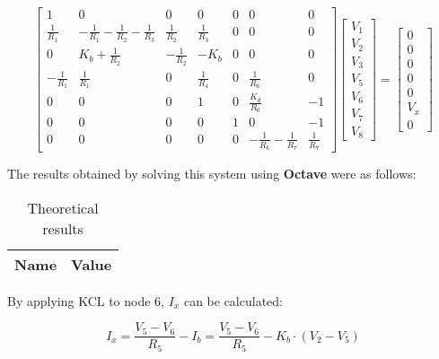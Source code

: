 \begin{equation}
  \begin{bmatrix}
    1 & 0 & 0 & 0 & 0 & 0 & 0 \\
    \frac{1}{R_1} & -\frac{1}{R_1}-\frac{1}{R_2}-\frac{1}{R_3} & \frac{1}{R_2} & \frac{1}{R_3} & 0 & 0 & 0 \\
    0 & K_b + \frac{1}{R_2} & -\frac{1}{R_2} & -K_b & 0 & 0 & 0 \\
    -\frac{1}{R_1} & \frac{1}{R_1} & 0 & \frac{1}{R_4} & 0 &\frac{1}{R_6} & 0 \\
    0 & 0 & 0 & 1 & 0 & \frac{K_d}{R_6} & -1 \\
    0 & 0 & 0 & 0 & 1 & 0 & -1 \\
    0 & 0 & 0 & 0 & 0 & -\frac{1}{R_6}-\frac{1}{R_7} & \frac{1}{R_7}
  \end{bmatrix}
  \begin{bmatrix}
    V_1 \\
    V_2 \\
    V_3 \\
    V_5 \\
    V_6 \\
    V_7 \\
    V_8
  \end{bmatrix}
  =
  \begin{bmatrix}
    0 \\
    0 \\
    0 \\
    0 \\
    0 \\
    V_x \\
    0
  \end{bmatrix}
\end{equation}

The results obtained by solving this system using \textbf{Octave} were as follows:

\begin{table}[H]
  \centering
  \begin{tabular}{|c|c|}
    \hline
        {\bf Name} & {\bf Value} \\
        \hline
        \hline
        
        \hline
  \end{tabular}
  \caption{Theoretical results}
\end{table}

By applying KCL to node 6, $I_x$ can be calculated:

\begin{equation}
  I_x = \frac{V_5-V_6}{R_5}-I_b = \frac{V_5-V_6}{R_5} - K_b \cdot (V_2-V_5)
\end{equation}

